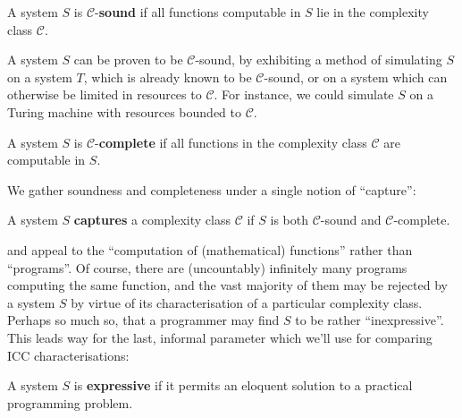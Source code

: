 \begin{definition} \label{def:icc-soundness} A system $S$ is
$\mathcal{C}$-\textbf{sound} if all functions computable in $S$ lie in the
complexity class $\mathcal{C}$.\end{definition} 

A system $S$ can be proven to be $\mathcal{C}$-sound, by exhibiting a method of
simulating $S$ on a system $T$, which is already known to be
$\mathcal{C}$-sound, or on a system which can otherwise be limited in resources
to $\mathcal{C}$. For instance, we could simulate $S$ on a Turing machine with
resources bounded to $\mathcal{C}$.

\begin{definition} \label{def:icc-completeness} A system $S$ is
$\mathcal{C}$-\textbf{complete} if all functions in the complexity class
$\mathcal{C}$ are computable in $S$.\end{definition}

We gather soundness and completeness under a single notion of ``capture'':

\begin{definition} \label{def:icc-capture} A system $S$ \textbf{captures} a
complexity class $\mathcal{C}$ if $S$ is both $\mathcal{C}$-sound and
$\mathcal{C}$-complete.  \end{definition}

 and  appeal to the
``computation of (mathematical) functions'' rather than ``programs''. Of
course, there are (uncountably) infinitely many programs computing the same
function, and the vast majority of them may be rejected by a system $S$ by
virtue of its characterisation of a particular complexity class. Perhaps so
much so, that a programmer may find $S$ to be rather ``inexpressive''. This
leads way for the last, informal parameter which we'll use for comparing ICC
characterisations:

\begin{notion} A system $S$ is \textbf{expressive} if it permits an eloquent
solution to a practical programming problem.\end{notion}



